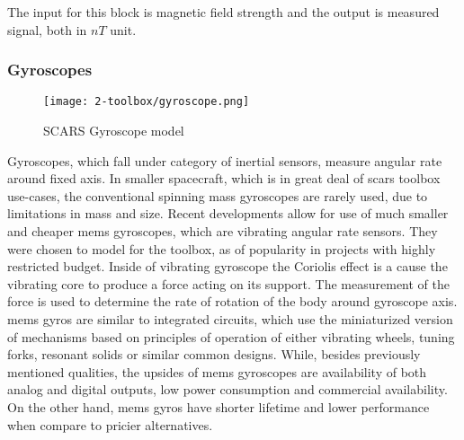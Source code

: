        The input for this block is magnetic field strength and the output is measured signal, both in $nT$ unit.


    \subsubsection{Gyroscopes}

        \begin{figure}[H]
            \centering
            \texttt{[image: 2-toolbox/gyroscope.png]}
            \caption{SCARS Gyroscope model}
            \label{fig:gryo_simulink}
        \end{figure}

        Gyroscopes, which fall under category of inertial sensors, measure angular rate around fixed axis. In smaller spacecraft, which is in great deal of \ac{scars} toolbox use-cases, the conventional spinning mass gyroscopes are rarely used, due to limitations in mass and size. Recent developments allow for use of much smaller and cheaper \ac{mems} gyroscopes, which are vibrating angular rate sensors. They were chosen to model for the toolbox, as of popularity in projects with highly restricted budget. \cite{armenise2010advances} Inside of vibrating gyroscope the Coriolis effect is a cause the vibrating core to produce a force acting on its support. The measurement of the force is used to determine the rate of rotation of the body around gyroscope axis. \ac{mems} gyros are similar to integrated circuits, which use the miniaturized version of mechanisms based on principles of operation of either vibrating wheels, tuning forks, resonant solids or similar common designs. \cite{bernstein2003overview} While, besides previously mentioned qualities, the upsides of \ac{mems} gyroscopes are availability of both analog and digital outputs, low power consumption and commercial availability. On the other hand, \ac{mems} gyros have shorter lifetime and lower performance when compare to pricier alternatives.

